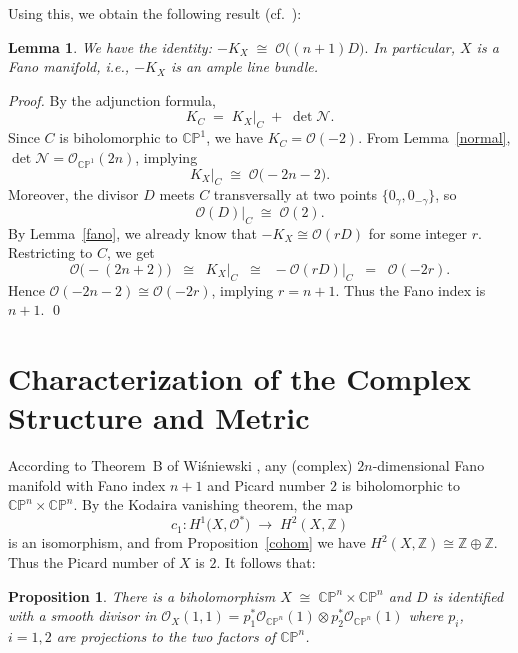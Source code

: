 \documentclass[a4paper, 12pt]{article}
\newcommand{\oX}{X}
\newcommand{\bZ}{\mathbb{Z}}
\newcommand{\bCP}{\mathbb{CP}^n}
\newcommand{\tCP}{\mathbb{CP}^n\times\mathbb{CP}^n}
\newcommand{\cO}{\mathcal{O}}
\newcommand{\cN}{\mathcal{N}}
\newtheorem{prop}[thm]{Proposition}
\newtheorem{lem}[thm]{Lemma}
\begin{document}
Using this, we obtain the following result (cf.\ \cite[Lemma~8]{BL18}):

\begin{lem}\label{lem-ind}
We have the identity:
$
-K_{\oX} \;\cong\;\cO\bigl((n+1)D\bigr).
$
In particular, $X$ is a Fano manifold, i.e., $-K_X$ is an ample line bundle. 
\end{lem}

\noindent\textit{Proof.}
By the adjunction formula,
\[
K_C \;=\; K_{\oX}\bigl|_{C} \;+\; \det \cN.
\]
Since \(C\) is biholomorphic to \(\mathbb{CP}^1\), we have \(K_C = \cO(-2)\). From Lemma~\ref{normal}, \(\det \cN = \cO_{\mathbb{CP}^1}(2n)\), implying
\[
K_{\oX}\bigl|_{C} \;\cong\; \cO\bigl(-2n-2\bigr).
\]
Moreover, the divisor \(D\) meets \(C\) transversally at two points \(\{0_\gamma,0_{-\gamma}\}\), so 
\[
\cO(D)\bigl|_{C} \;\cong\;\cO(2).
\]
By Lemma~\ref{fano}, we already know that \(-K_{\oX}\cong\cO(rD)\) for some integer \(r\). Restricting to \(C\), we get
\[
\cO\bigl(-(2n+2)\bigr)
\;\;\cong\;\;
K_{\oX}\bigl|_{C}
\;\;\cong\;\;
-\cO(rD)\bigl|_{C}
\;\;=\;\;\cO(-2r).
\]
Hence \(\cO(-2n-2)\cong\cO(-2r)\), implying \(r=n+1\). Thus the Fano index is \(n+1\). 
\qed

\section{Characterization of the Complex Structure and Metric}

According to Theorem~B of Wi\'sniewski \cite{W90}, any (complex) \(2n\)-dimensional Fano manifold with Fano index \(n+1\) and Picard number \(2\) is biholomorphic to \(\tCP\). By the Kodaira vanishing theorem, the map 
\[
c_1:H^1\bigl(\oX,\cO^*\bigr)\;\longrightarrow\; H^2(\oX,\bZ)
\]
is an isomorphism, and from Proposition~\ref{cohom} we have \(H^2(\oX,\bZ)\cong \bZ\oplus\bZ\). Thus the Picard number of \(\oX\) is \(2\). It follows that:

\begin{prop}\label{algeb}
There is a biholomorphism
\(\oX \;\cong\;\tCP\) and $D$ is identified with a smooth divisor in $\cO_{\oX}(1,1)=p_1^*\cO_{\bCP}(1)\otimes p_2^*\cO_{\bCP}(1)$ where $p_i$, $i=1,2$ are projections to the two factors of $\bCP$. 
\end{prop}

\end{document}
